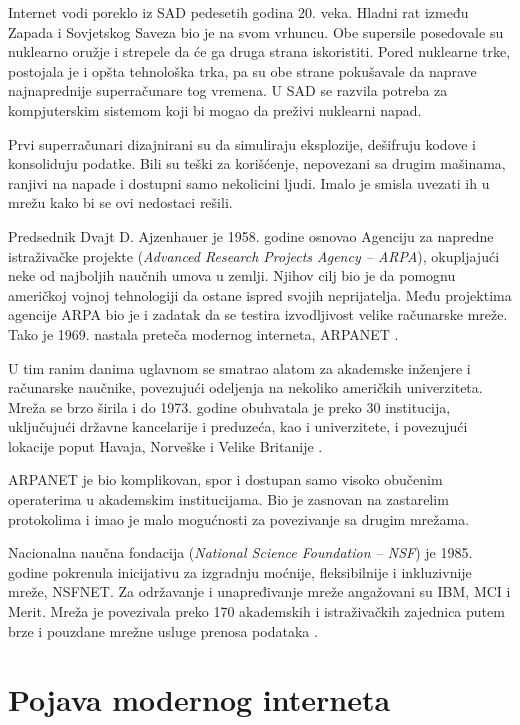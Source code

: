 \documentclass[12pt,a4paper]{article}
\begin{document}
Internet vodi poreklo iz SAD pedesetih godina 20. veka. Hladni rat između Zapada i Sovjetskog Saveza bio je na svom vrhuncu. Obe supersile posedovale su nuklearno oružje i strepele da će ga druga strana iskoristiti. Pored nuklearne trke, postojala je i opšta tehnološka trka, pa su obe strane pokušavale da naprave najnaprednije superračunare tog vremena. U SAD se razvila potreba za kompjuterskim sistemom koji bi mogao da preživi nuklearni napad.

Prvi superračunari dizajnirani su da simuliraju eksplozije, dešifruju kodove i konsoliduju podatke. Bili su teški za korišćenje, nepovezani sa drugim mašinama, ranjivi na napade i dostupni samo nekolicini ljudi. Imalo je smisla uvezati ih u mrežu kako bi se ovi nedostaci rešili.

Predsednik Dvajt D. Ajzenhauer je 1958. godine osnovao Agenciju za napredne istraživačke projekte (\textit{Advanced Research Projects Agency – ARPA}), okupljajući neke od najboljih naučnih umova u zemlji. Njihov cilj bio je da pomognu američkoj vojnoj tehnologiji da ostane ispred svojih neprijatelja. Među projektima agencije ARPA bio je i zadatak da se testira izvodljivost velike računarske mreže. Tako je 1969. nastala preteča modernog interneta, ARPANET \cite{arpanet_history}.

U tim ranim danima uglavnom se smatrao alatom za akademske inženjere i računarske naučnike, povezujući odeljenja na nekoliko američkih univerziteta. Mreža se brzo širila i do 1973. godine obuhvatala je preko 30 institucija, uključujući državne kancelarije i preduzeća, kao i univerzitete, i povezujući lokacije poput Havaja, Norveške i Velike Britanije \cite{arpanet_history}.

ARPANET je bio komplikovan, spor i dostupan samo visoko obučenim operaterima u akademskim institucijama. Bio je zasnovan na zastarelim protokolima i imao je malo mogućnosti za povezivanje sa drugim mrežama.

Nacionalna naučna fondacija (\textit{National Science Foundation – NSF}) je 1985. godine pokrenula inicijativu za izgradnju moćnije, fleksibilnije i inkluzivnije mreže, NSFNET. Za održavanje i unapređivanje mreže angažovani su IBM, MCI i Merit. Mreža je povezivala preko 170 akademskih i istraživačkih zajednica putem brze i pouzdane mrežne usluge prenosa podataka \cite{nsfnet_history}.

\section{Pojava modernog interneta}
\end{document}
